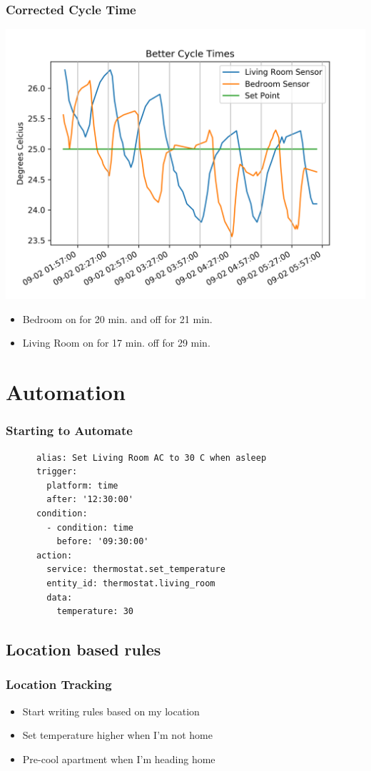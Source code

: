 \documentclass[aspectratio=169,11pt,hyperref={colorlinks=true}]{beamer}
\begin{document}
\begin{frame}
    \frametitle{Corrected Cycle Time}
    \begin{center}
        \includegraphics[height=.75\textheight]{long_cycle.png}
    \end{center}
    \begin{itemize}
        \item Bedroom on for 20 min. and off for 21 min.
        \item Living Room on for 17 min. off for 29 min.
    \end{itemize}
\end{frame}

\section{Automation}
\begin{frame}[fragile=singleslide]
    \frametitle{Starting to Automate}
    \begin{verbatim}
      alias: Set Living Room AC to 30 C when asleep
      trigger:
        platform: time
        after: '12:30:00'
      condition:
        - condition: time
          before: '09:30:00'
      action:
        service: thermostat.set_temperature
        entity_id: thermostat.living_room
        data:
          temperature: 30
    \end{verbatim}
\end{frame}

\subsection{Location based rules}
\begin{frame}
    \frametitle{Location Tracking}
    \begin{itemize}
        \item Start writing rules based on my location
        \item Set temperature higher when I'm not home
        \item Pre-cool apartment when I'm heading home
    \end{itemize}
\end{frame}
\end{document}
